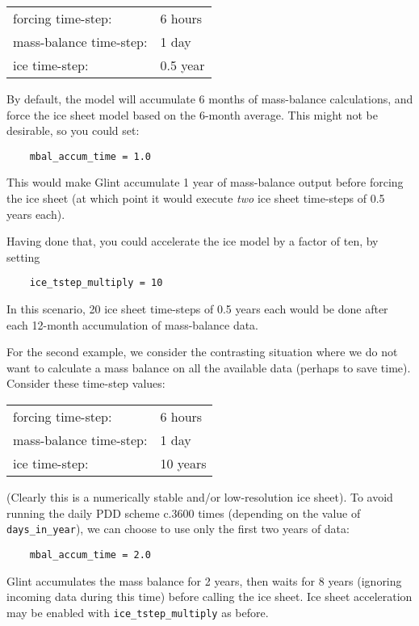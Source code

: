 \vspace{0.5cm}
\begin{tabular}{ll}
forcing time-step: & 6 hours \\
mass-balance time-step: & 1 day \\
ice time-step: & 0.5 year \\
\end{tabular}
\vspace{0.5cm}
%
\newline
By default, the model will accumulate 6 months of mass-balance 
calculations, and force the ice sheet model based on the 6-month average. This might not be 
desirable, so you could set:
%
\begin{verbatim}
    mbal_accum_time = 1.0
\end{verbatim}
%
This would make Glint accumulate 1 year of mass-balance output before 
forcing the ice sheet (at which point it would execute \emph{two} ice sheet 
time-steps of 0.5 years each).

Having done that, you could accelerate the ice model by a factor of ten, by 
setting

\begin{verbatim}
    ice_tstep_multiply = 10
\end{verbatim}
%
In this scenario, 20 ice sheet time-steps of 0.5 years each would be done 
after each 12-month accumulation of mass-balance data.

For the second example, we consider the contrasting situation where we do not want to calculate a 
mass balance on all the available data (perhaps to save time). Consider 
these time-step values:

\vspace{0.5cm}
\begin{tabular}{ll}
forcing time-step:   &   6 hours \\
mass-balance time-step: & 1 day \\
ice time-step:       &   10 years\\
\end{tabular}
\vspace{0.5cm}
%
\newline
(Clearly this is a numerically stable and/or low-resolution ice sheet).
To avoid running the daily PDD scheme c.3600 times (depending on the value of 
\texttt{days\_in\_year}), we can choose to use only the first two years of data:

\begin{verbatim}
    mbal_accum_time = 2.0
\end{verbatim}
%
Glint accumulates the mass balance for 2 years, then waits for 8 years (ignoring incoming 
data during this time) before calling the ice sheet. Ice sheet 
acceleration may be enabled with \texttt{ice\_tstep\_multiply} as before.

